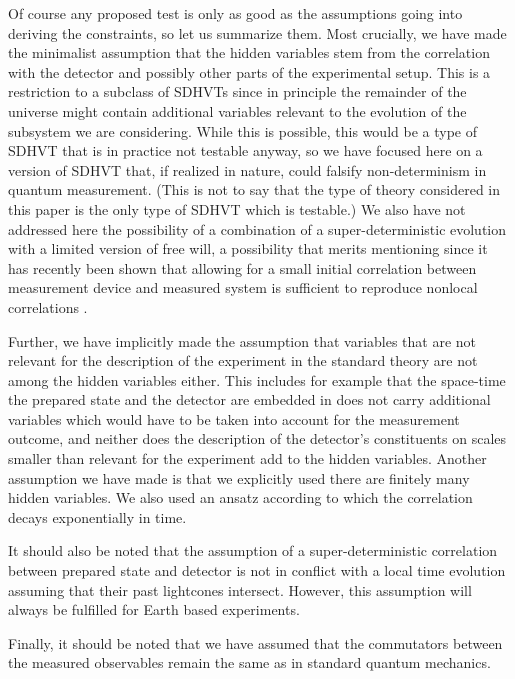 \documentclass{svjour2}                    %
\begin{document}
Of course any proposed test is only as good as the assumptions going into
deriving the constraints, so let us summarize them. Most crucially, 
we have made the minimalist assumption that the hidden
variables stem from the correlation with the detector and possibly other
parts of the experimental setup. This is a restriction to a subclass of
{\sc SDHVT}s since in principle the remainder of the universe might contain additional variables relevant
to the evolution of the subsystem we are considering. While this is possible,
this would be a type of {\sc SDHVT} that is in practice not testable anyway, 
so we have focused here on a version of {\sc SDHVT} that, if realized in nature, 
could falsify non-determinism in quantum measurement. (This is not to say
that the type of theory considered in this paper is the only type of {\sc SDHVT} 
which is testable.) We also have not addressed here the possibility of a
combination of a super-deterministic evolution with a limited version of free will,
a possibility that merits mentioning  since it has recently been shown that 
allowing for a small initial correlation between measurement device and 
measured system is sufficient to reproduce nonlocal correlations \cite{partial}.


Further, we have implicitly made the assumption that variables that are not
relevant for the description of the experiment in the standard theory
are not among the hidden variables either. This includes for example that
the space-time the prepared state and the detector are embedded in does 
not carry additional variables which would have to be taken into account for 
the measurement outcome, and neither does the description of the detector's
constituents on scales smaller than relevant for the experiment add to the
hidden variables. Another assumption we have made is that we explicitly
used there are finitely many hidden variables. We also used an ansatz
according to which the correlation decays exponentially in time. 

It should also be noted that the assumption of a super-deterministic
correlation between prepared state and detector is not in conflict with
a local time evolution assuming that their past lightcones intersect. However, 
this assumption will always be fulfilled for Earth based experiments.

Finally, it should be noted that we have assumed that the commutators
between the measured observables remain the same as in standard quantum
mechanics.
\end{document}
